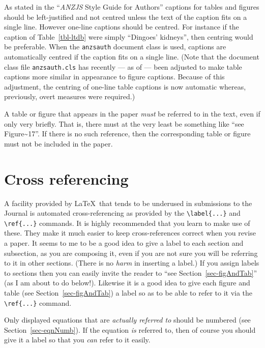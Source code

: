 \documentclass[
  times,
  doublespace]{anzsauth}
\begin{document}
As stated in the ``\emph{ANZJS} Style Guide for Authors'' captions for
tables and figures should be left-justified and not centred unless the
text of the caption fits on a single line. However one-line captions
should be centred. For instance if the caption of Table~\ref{tbl-ltdb}
were simply ``Dingoes' kidneys'', then centring would be preferable.
When the \texttt{anzsauth} document class is used, captions are
automatically centred if the caption fits on a single line. (Note that
the document class file \texttt{anzsauth.cls} has recently --- as of
 --- been adjusted to make table captions more
similar in appearance to figure captions. Because of this adjustment,
the centring of one-line table captions is now automatic whereas,
previously, overt measures were required.)

A table or figure that appears in the paper \emph{must} be referred to
in the text, even if only very briefly. That is, there must at the very
least be something like ``see Figure\textasciitilde17''. If there is no
such reference, then the corresponding table or figure must not be
included in the paper.

\section{Cross referencing}\label{sec-crossref}

A facility provided by \LaTeX~that tends to be underused in submissions
to the Journal is automated cross-referencing as provided by the
\texttt{\textbackslash{}label\{...\}} and
\texttt{\textbackslash{}ref\{...\}} commands. It is highly recommended
that you learn to make use of these. They make it much easier to keep
cross-references correct when you revise a paper. It seems to me to be a
good idea to give a label to each section and subsection, as you are
composing it, even if you are not sure you will be referring to it in
other sections. (There is no \emph{harm} in inserting a label.) If you
assign labels to sections then you can easily invite the reader to ``see
Section~\ref{sec-figAndTab}'' (as I am about to do below!). Likewise it
is a good idea to give each figure and table (see
Section~\ref{sec-figAndTab}) a label so as to be able to refer to it via
the \texttt{\textbackslash{}ref\{...\}} command.

Only displayed equations that are \emph{actually referred to} should be
numbered (see Section~\ref{sec-eqnNumb}). If the equation \emph{is}
referred to, then of course you should give it a label so that you
\emph{can} refer to it easily.
\end{document}
